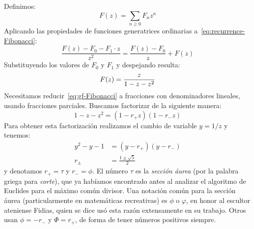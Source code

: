   Definimos:
  \begin{equation*}
    F(z)
      = \sum_{n \ge 0} F_n z^n
  \end{equation*}
  Aplicando las propiedades de funciones generatrices ordinarias
  a~\eqref{eq:recurrence-Fibonacci}:
  \begin{equation*}
    \frac{F(z) - F_0 - F_1 \cdot z}{z^2}
      = \frac{F(z) - F_0}{z} + F(z)
  \end{equation*}
  Substituyendo los valores de \(F_0\) y \(F_1\)
  y despejando resulta:
  \begin{equation}
    \index{Fibonacci, numeros de@Fibonacci, números de!generatriz|textbfhy}
    \label{eq:gf-Fibonacci}
    F(z)
      = \frac{z}{1 - z - z^2}
  \end{equation}
  Necesitamos reducir~\eqref{eq:gf-Fibonacci}
  a fracciones con denominadores lineales,
  usando fracciones parciales.
  Buscamos factorizar de la siguiente manera:
  \begin{equation*}
    1 - z - z^2 = (1 - r_{+} z) (1 - r_{-} z)
  \end{equation*}
  Para obtener esta factorización
  realizamos el cambio de variable \(y = 1 / z\)
  y tenemos:
  \begin{align*}
    y^2 - y - 1
      &= (y - r_{+}) (y - r_{-}) \\
    r_{\pm}
      &= \frac{1 \pm \sqrt{5}}{2}
  \end{align*}
  y denotamos \(r_{+} = \tau\) y \(r_{-} = \phi\).
  El número \(\tau\) es la \emph{sección áurea}%
  (por la palabra griega para \emph{corte}),
  que ya habíamos encontrado antes
  al analizar el algoritmo de Euclides%
  para el máximo común divisor.
  Una notación común para la sección áurea
  (particularmente en matemáticas recreativas)
  es \(\phi\) o \(\varphi\),
  en honor al escultor ateniense Fidias,%
  quien se dice usó esta razón extensamente en su trabajo.
  Otros usan \(\phi = - r_{-}\) y \(\Phi = r_{+}\),
  de forma de tener números positivos siempre.

